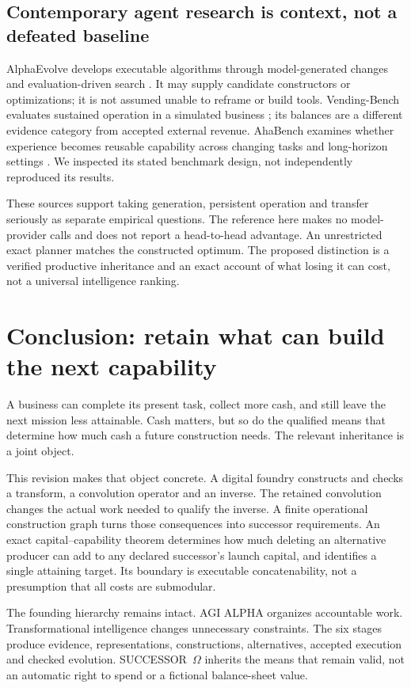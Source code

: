 \documentclass[11pt,letterpaper]{article}
\newcommand{\Om}{SUCCESSOR~$\Omega$}
\theoremstyle{definition}\newtheorem{definition}[theorem]{Definition}
\theoremstyle{remark}\newtheorem{remark}[theorem]{Remark}
\begin{document}
\subsection{Contemporary agent research is context, not a defeated baseline}
AlphaEvolve develops executable algorithms through model-generated changes and evaluation-driven search \cite{alphaevolve}. It may supply candidate constructors or optimizations; it is not assumed unable to reframe or build tools. Vending-Bench evaluates sustained operation in a simulated business \cite{vending}; its balances are a different evidence category from accepted external revenue. AhaBench examines whether experience becomes reusable capability across changing tasks and long-horizon settings \cite{aha}. We inspected its stated benchmark design, not independently reproduced its results.

These sources support taking generation, persistent operation and transfer seriously as separate empirical questions. The reference here makes no model-provider calls and does not report a head-to-head advantage. An unrestricted exact planner matches the constructed optimum. The proposed distinction is a verified productive inheritance and an exact account of what losing it can cost, not a universal intelligence ranking.

\section{Conclusion: retain what can build the next capability}
A business can complete its present task, collect more cash, and still leave the next mission less attainable. Cash matters, but so do the qualified means that determine how much cash a future construction needs. The relevant inheritance is a joint object.

This revision makes that object concrete. A digital foundry constructs and checks a transform, a convolution operator and an inverse. The retained convolution changes the actual work needed to qualify the inverse. A finite operational construction graph turns those consequences into successor requirements. An exact capital--capability theorem determines how much deleting an alternative producer can add to any declared successor's launch capital, and identifies a single attaining target. Its boundary is executable concatenability, not a presumption that all costs are submodular.

The founding hierarchy remains intact. AGI ALPHA organizes accountable work. Transformational intelligence changes unnecessary constraints. The six stages produce evidence, representations, constructions, alternatives, accepted execution and checked evolution. \Om{} inherits the means that remain valid, not an automatic right to spend or a fictional balance-sheet value.
\end{document}
